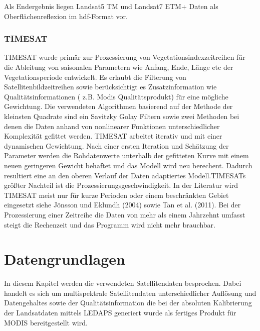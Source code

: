 \documentclass[11pt]{report}
\begin{document}
Als Endergebnis liegen Landsat5 TM und Landsat7 ETM+ Daten als Oberflächenreflexion im hdf-Format vor. 


\subsection{TIMESAT}
TIMESAT wurde primär zur Prozessierung von Vegetationsindexzeitreihen für die  Ableitung von saisonalen Parametern wie Anfang, Ende, Länge etc der Vegetationsperiode entwickelt. Es erlaubt die Filterung von Satellitenbildzeitreihen sowie berücksichtigt es Zusatzinformation wie Qualitätsinformationen ( z.B. Modis Qualitätsprodukt) für eine mögliche Gewichtung. Die verwendeten Algorithmen basierend auf der Methode der kleinsten Quadrate sind ein Savitzky Golay Filtern sowie zwei Methoden bei denen die Daten anhand von nonlinearer Funktionen unterschiedlicher Komplexität gefittet werden. TIMESAT arbeitet iterativ und mit einer dynamischen Gewichtung. Nach einer ersten Iteration und Schätzung der Parameter werden die Rohdatenwerte unterhalb der gefitteten Kurve mit einem neuen geringeren Gewicht behaftet und das Modell wird neu berechent. Dadurch resultiert eine an den oberen Verlauf der Daten adaptiertes Modell.TIMESATs größter Nachteil ist die Prozessierungsgeschwindigkeit. In der Literatur wird TIMESAT meist nur für kurze Perioden oder einem beschränkten Gebiet eingesetzt siehe Jönsson und Eklundh (2004) sowie Tan et al. (2011). Bei der Prozessierung einer Zeitreihe die Daten von mehr als einem Jahrzehnt umfasst steigt die Rechenzeit und das Programm wird nicht mehr brauchbar. 


% 
% 




\chapter{Datengrundlagen}
In diesem Kapitel werden die verwendeten Satellitendaten besprochen. Dabei handelt es sich um multispektrale Satellitendaten unterschiedlicher Auflösung und Datengehaltes  sowie der Qualitätsinformation die bei der absoluten Kalibrierung der Landsatdaten mittels LEDAPS generiert wurde als fertiges Produkt für MODIS bereitgestellt wird.
\end{document}
